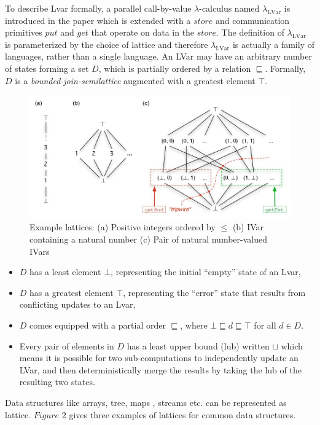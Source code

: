 \documentclass[twocolumn]{article}
\newcommand{\lambdaLVar}{\ensuremath{\lambda_{\textrm{LVar}}}}
\newcommand{\userleq}{\ensuremath{\sqsubseteq}}
\begin{document}
To describe Lvar formally, a parallel call-by-value $\lambda$-calculus named $\lambdaLVar$ is introduced in the paper\cite{lkuper} which is extended with a $store$ and communication primitives $put$ and $get$ that operate on data in the $store$. The definition of $\lambdaLVar$ is parameterized by the choice of lattice and therefore $\lambdaLVar$ is actually a family of languages, rather than a single language. An LVar may have an arbitrary number of states forming a set $D$, which is partially ordered by a relation $\userleq$. Formally, $D$ is a \emph{bounded-join-semilattice} augmented with a greatest element $\top$. 

\begin{figure}
\centerline{
\includegraphics[width=1.0\columnwidth]{Figures/lattice.jpg}
}
\caption{Example lattices\cite{lkuper}: (a) Positive integers ordered by $\leq$ (b) IVar containing a natural number (c) Pair of natural number-valued IVars}
\label{Figure1}
\end{figure}
\begin{itemize}
\item $D$ has a least element $\bot$, representing the initial “empty” state of an Lvar,
\item $D$ has a greatest element $\top$, representing the “error” state that results from conflicting updates to an Lvar,
\item $D$ comes equipped with a partial order $\userleq$, where $\bot \userleq d \userleq \top$ for all $d \in D$.
\item Every pair of elements in $D$ has a least upper bound (lub) written $\sqcup$ which means it is possible for two sub-computations to independently update an LVar, and then deterministically merge the results by taking the lub of the resulting two states.
\end{itemize}
Data structures like arrays, tree, maps , streams etc. can be represented  as lattice. $Figure$ $2$ gives three examples of lattices for common data structures.
 
\end{document}
